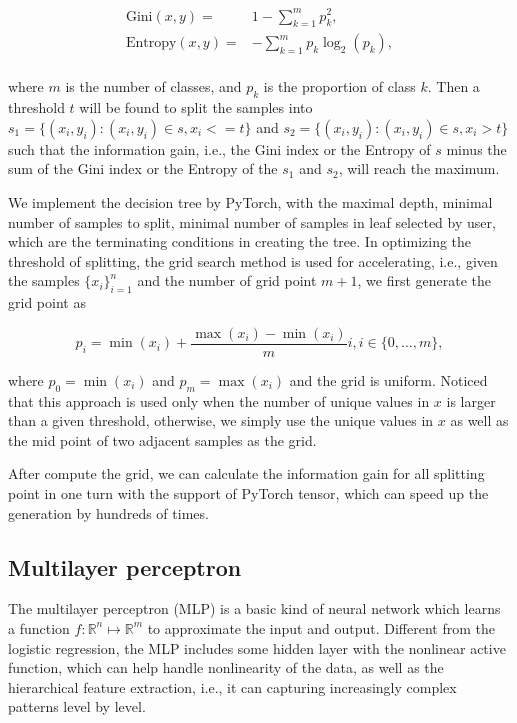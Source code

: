 \documentclass[11pt]{article}
\begin{document}
$$
  \begin{aligned}
    \text{Gini} (x, y) =    & 1 - \sum_{k=1}^m p_k^2,          \\
    \text{Entropy} (x, y) = & - \sum_{k=1}^m p_k \log_2 (p_k), \\
  \end{aligned}
$$

\noindent where $m$ is the number of classes, and $p_k$ is the proportion of class $k$. Then a threshold $t$ will be found to split the samples into $s_1 = \{(x_i, y_i): (x_i, y_i) \in s, x_i <= t \}$ and $s_2 = \{(x_i, y_i): (x_i, y_i) \in s, x_i > t \}$ such that the information gain, i.e., the Gini index or the Entropy of $s$ minus the sum of the Gini index or the Entropy of the $s_1$ and $s_2$, will reach the maximum.

We implement the decision tree by PyTorch, with the maximal depth, minimal number of samples to split, minimal number of samples in leaf selected by user, which are the terminating conditions in creating the tree. In optimizing the threshold of splitting, the grid search method is used for accelerating, i.e., given the samples $\{x_i\}_{i=1}^n$ and the number of grid point $m + 1$, we first generate the grid point as

$$
  p_i = \min(x_i) + \frac{\max(x_i) - \min(x_i)}{m} i, i \in \{0, \dots, m\},
$$

\noindent where $p_0 = \min(x_i)$ and $p_{m} = \max(x_i)$ and the grid is uniform. Noticed that this approach is used only when the number of unique values in $x$ is larger than a given threshold, otherwise, we simply use the unique values in $x$ as well as the mid point of two adjacent samples as the grid.

After compute the grid, we can calculate the information gain for all splitting point in one turn with the support of PyTorch tensor, which can speed up the generation by hundreds of times.

\subsection{Multilayer perceptron}

The multilayer perceptron (MLP) \cite{rosenblatt1958perceptron} \cite{rumelhart1986learning} is a basic kind of neural network which learns a function $f: \mathbb{R}^n \mapsto \mathbb{R}^m$ to approximate the input and output. Different from the logistic regression, the MLP includes some hidden layer with the nonlinear active function, which can help handle nonlinearity of the data, as well as the hierarchical feature extraction, i.e., it can capturing increasingly complex patterns level by level.
\end{document}
